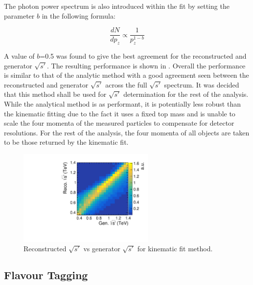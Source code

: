 The photon power spectrum is also introduced within the fit by setting the parameter $b$ in the following formula:

\begin{equation}
\frac{dN}{dp_z}\propto\frac{1}{p_z^{1-b}}
\end{equation}

A value of $b$=0.5 was found to give the best agreement for the reconstructed and generator $\sqrt{s'}$. The resulting performance is shown in . Overall the performance is similar to that of the analytic method with a good agreement seen between the reconstructed and generator $\sqrt{s'}$ across the full $\sqrt{s'}$ spectrum. It was decided that this method shall be used for $\sqrt{s'}$ determination for the rest of the analysis. While the analytical method is as performant, it is potentially less robust than the kinematic fitting due to the fact it uses a fixed top mass and is unable to scale the four momenta of the measured particles to compensate for detector resolutions.  For the rest of the analysis, the four momenta of all objects are taken to be those returned by the kinematic fit.

\begin{figure}
  \centering
  \includegraphics[width=0.6\textwidth]{TopAnalysis/figures/KinEVsTrueE.pdf}
  \caption[Reconstructed $\sqrt{s'}$ vs generator $\sqrt{s'}$ for kinematic fit  method]{Reconstructed $\sqrt{s'}$ vs generator $\sqrt{s'}$ for kinematic fit method.}
  \label{fig:KinFit}
\end{figure}

\subsection{Flavour Tagging}
\label{Flavour Tagging}

